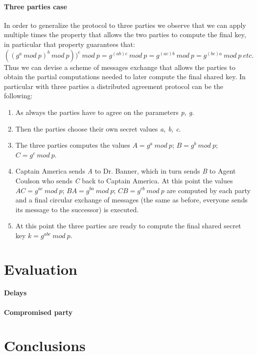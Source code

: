 \documentclass[11pt]{article}
\begin{document}
\paragraph*{Three parties case}
In order to generalize the protocol to three parties we observe that we can apply multiple times the property that allows the two parties to compute the final key, in particular that property guarantees that:\\
$((g^a\ mod\ p)^b\ mod\ p))^c\ mod\ p = g^{(ab)c}\ mod\ p = g^{(ac)b}\ mod\ p = g^{(bc)a}\ mod\ p\ etc.$\\
Thus we can devise a scheme of messages exchange that allows the parties to obtain the partial computations needed to later compute the final shared key.
In particular with three parties a distributed agreement protocol can be the following:\\
\begin{enumerate}
\item As always the parties have to agree on the parameters \textit{p, g}.
\item Then the parties choose their own secret values \textit{a, b, c}.
\item The three parties computes the values $A = g^a\ mod\ p$; $B = g^b\ mod\ p$; $C = g^c\ mod\ p$.
\item Captain America sends \textit{A} to Dr. Banner, which in turn sends \textit{B} to Agent Coulson who sends \textit{C} back to Captain America. At this point the values $AC = g^{ac}\ mod\ p$; $BA = g^{ba}\ mod\ p$; $CB = g^{cb}\ mod\ p$ are computed by each party and a final circular exchange of messages (the same as before, everyone sends its message to the successor) is executed.
\item At this point the three parties are ready to compute the final shared secret key $k = g^{abc}\ mod\ p$.
\end{enumerate}

\section{Evaluation}
\paragraph*{Delays}

\paragraph*{Compromised party}

\section{Conclusions}


\nocite{*} %
 

\end{document}
